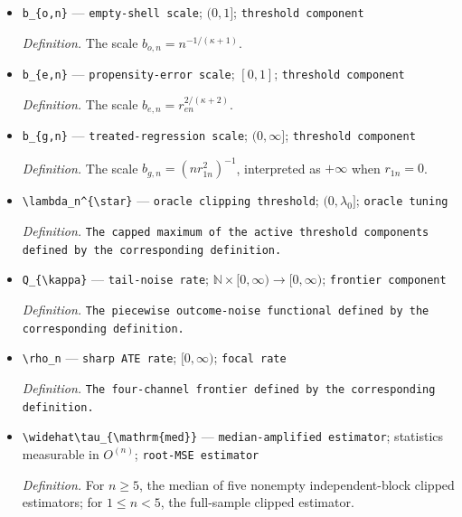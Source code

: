 \documentclass{article}
\begin{document}
\begin{itemize}
  \item \texttt{b\_\allowbreak{}\{o,\allowbreak{}n\}\allowbreak{}} --- \texttt{empty-\allowbreak{}shell scale}; \((0,1]\); \texttt{threshold component}
  \par\smallskip\noindent\emph{Definition.} The scale \(b_{o,n}=n^{-1/(\kappa+1)}\).
  \item \texttt{b\_\allowbreak{}\{e,\allowbreak{}n\}\allowbreak{}} --- \texttt{propensity-\allowbreak{}error scale}; \([0,1]\); \texttt{threshold component}
  \par\smallskip\noindent\emph{Definition.} The scale \(b_{e,n}=r_{en}^{2/(\kappa+2)}\).
  \item \texttt{b\_\allowbreak{}\{g,\allowbreak{}n\}\allowbreak{}} --- \texttt{treated-\allowbreak{}regression scale}; \((0,\infty]\); \texttt{threshold component}
  \par\smallskip\noindent\emph{Definition.} The scale \(b_{g,n}=(n r_{1n}^2)^{-1}\), interpreted as \(+\infty\) when \(r_{1n}=0\).
  \item \texttt{\textbackslash{}\allowbreak{}lambda\_\allowbreak{}n\textasciicircum{}\{\textbackslash{}\allowbreak{}star\}\allowbreak{}} --- \texttt{oracle clipping threshold}; \((0,\lambda_0]\); \texttt{oracle tuning}
  \par\smallskip\noindent\emph{Definition.} \texttt{The capped maximum of the active threshold components defined by the corresponding definition.}
  \item \texttt{Q\_\allowbreak{}\{\textbackslash{}\allowbreak{}kappa\}\allowbreak{}} --- \texttt{tail-\allowbreak{}noise rate}; \(\mathbb N\times[0,\infty)\to[0,\infty)\); \texttt{frontier component}
  \par\smallskip\noindent\emph{Definition.} \texttt{The piecewise outcome-\allowbreak{}noise functional defined by the corresponding definition.}
  \item \texttt{\textbackslash{}\allowbreak{}rho\_\allowbreak{}n} --- \texttt{sharp ATE rate}; \([0,\infty)\); \texttt{focal rate}
  \par\smallskip\noindent\emph{Definition.} \texttt{The four-\allowbreak{}channel frontier defined by the corresponding definition.}
  \item \texttt{\textbackslash{}\allowbreak{}widehat\textbackslash{}\allowbreak{}tau\_\allowbreak{}\{\textbackslash{}\allowbreak{}mathrm\{med\}\allowbreak{}\}\allowbreak{}} --- \texttt{median-\allowbreak{}amplified estimator}; statistics measurable in \(O^{(n)}\); \texttt{root-\allowbreak{}MSE estimator}
  \par\smallskip\noindent\emph{Definition.} For \(n\ge5\), the median of five nonempty independent-block clipped estimators; for \(1\le n<5\), the full-sample clipped estimator.

\end{itemize}
\end{document}
